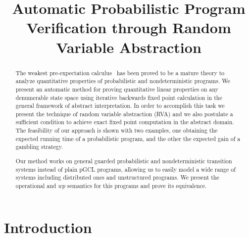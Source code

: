 \documentclass{eptcs}
\title{
  Automatic Probabilistic Program Verification through Random Variable Abstraction
}
\author{
  Dami\'an Barsotti
\thanks{Granted by MinCyT PID2008, Gobierno de la Provincia de C\'ordoba.}
\and
  Nicol\'as Wolovick
  \footnotemark[1]
\end{tabular}\\[2ex]
  \footnotesize{Fa.M.A.F., Universidad Nacional de C\'ordoba, Ciudad Universitaria, 5000
  C\'ordoba, Argentina}
\begin{tabular}[t]{c}
}
\theoremstyle{plain}
\theoremstyle{definition}
\newcommand{\lit}[1]{\ensuremath{\mathit{#1}}}
\newcommand{\Wp}{\lit{wp}}
\begin{document}
\maketitle


\begin{abstract}
  The weakest pre-expectation calculus~\cite{morgan04arp} has been
  proved to be a mature theory to analyze quantitative properties of
  probabilistic and nondeterministic programs. We present an automatic
  method for proving quantitative linear properties on any denumerable
  state space using iterative backwards fixed point calculation in the
  general framework of abstract interpretation. In order to accomplish
  this task we present the technique of random variable abstraction
  (RVA) and we also postulate a sufficient condition to achieve
  exact fixed point computation in the abstract domain.  The
  feasibility of our approach is shown with two examples, one
  obtaining the expected running time of a probabilistic program, and
  the other the expected gain of a gambling strategy.

  Our method works on general guarded probabilistic and
  nondeterministic transition systems instead of plain pGCL programs,
  allowing us to easily model a wide range of systems including
  distributed ones and unstructured programs. We present the
  operational and $\Wp$ semantics for this programs and
  prove its equivalence.

\end{abstract}







\section{Introduction}\label{intro}
\end{document}
